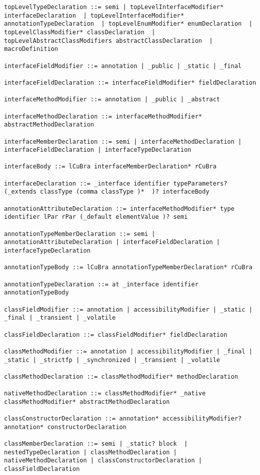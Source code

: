 \begin{lstlisting}[breaklines=true]
topLevelTypeDeclaration ::= semi | topLevelInterfaceModifier* interfaceDeclaration  | topLevelInterfaceModifier* annotationTypeDeclaration  | topLevelEnumModifier* enumDeclaration  | topLevelClassModifier* classDeclaration  | topLevelAbstractClassModifiers abstractClassDeclaration  | macroDefinition

interfaceFieldModifier ::= annotation | _public | _static | _final

interfaceFieldDeclaration ::= interfaceFieldModifier* fieldDeclaration

interfaceMethodModifier ::= annotation | _public | _abstract

interfaceMethodDeclaration ::= interfaceMethodModifier* abstractMethodDeclaration

interfaceMemberDeclaration ::= semi | interfaceMethodDeclaration | interfaceFieldDeclaration | interfaceTypeDeclaration

interfaceBody ::= lCuBra interfaceMemberDeclaration* rCuBra

interfaceDeclaration ::= _interface identifier typeParameters? (_extends classType (comma classType )*  )? interfaceBody

annotationAttributeDeclaration ::= interfaceMethodModifier* type identifier lPar rPar (_default elementValue )? semi

annotationTypeMemberDeclaration ::= semi | annotationAttributeDeclaration | interfaceFieldDeclaration | interfaceTypeDeclaration

annotationTypeBody ::= lCuBra annotationTypeMemberDeclaration* rCuBra

annotationTypeDeclaration ::= at _interface identifier annotationTypeBody

classFieldModifier ::= annotation | accessibilityModifier | _static | _final | _transient | _volatile

classFieldDeclaration ::= classFieldModifier* fieldDeclaration

classMethodModifier ::= annotation | accessibilityModifier | _final | _static | _strictfp | _synchronized | _transient | _volatile

classMethodDeclaration ::= classMethodModifier* methodDeclaration

nativeMethodDeclaration ::= classMethodModifier* _native classMethodModifier* abstractMethodDeclaration

classConstructorDeclaration ::= annotation* accessibilityModifier? annotation* constructorDeclaration

classMemberDeclaration ::= semi | _static? block  | nestedTypeDeclaration | classMethodDeclaration | nativeMethodDeclaration | classConstructorDeclaration | classFieldDeclaration


\end{lstlisting}

